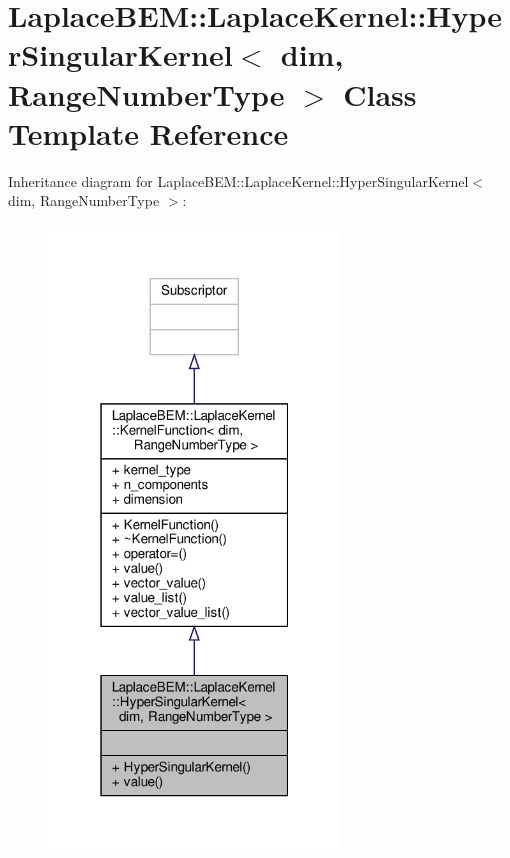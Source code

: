 \hypertarget{classLaplaceBEM_1_1LaplaceKernel_1_1HyperSingularKernel}{}\section{Laplace\+B\+EM\+:\+:Laplace\+Kernel\+:\+:Hyper\+Singular\+Kernel$<$ dim, Range\+Number\+Type $>$ Class Template Reference}
\label{classLaplaceBEM_1_1LaplaceKernel_1_1HyperSingularKernel}


Inheritance diagram for Laplace\+B\+EM\+:\+:Laplace\+Kernel\+:\+:Hyper\+Singular\+Kernel$<$ dim, Range\+Number\+Type $>$\+:\nopagebreak
\begin{figure}[H]
\begin{center}
\leavevmode
\includegraphics[width=220pt]{classLaplaceBEM_1_1LaplaceKernel_1_1HyperSingularKernel__inherit__graph}
\end{center}
\end{figure}


